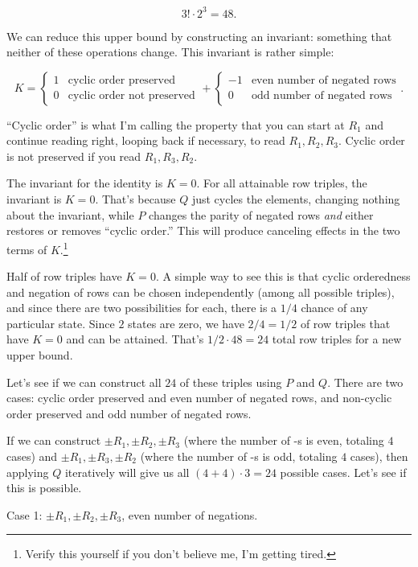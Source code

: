 \documentclass[../key.tex]{subfiles}
\begin{document}
$$3!\cdot 2^3 = 48.$$

We can reduce this upper bound by constructing an invariant: something that neither of these operations change. This invariant is rather simple:

$$K = \begin{cases}1 & \text{cyclic order preserved} \\ 0 & \text{cyclic order not preserved}\end{cases} + \begin{cases}-1 & \text{even number of negated rows} \\ 0 & \text{odd number of negated rows} \end{cases}.$$

``Cyclic order'' is what I'm calling the property that you can start at $R_1$ and continue reading right, looping back if necessary, to read $R_1,R_2,R_3$. Cyclic order is not preserved if you read $R_1,R_3,R_2$.

The invariant for the identity is $K=0$. For all attainable row triples, the invariant is $K=0$. That's because $Q$ just cycles the elements, changing nothing about the invariant, while $P$ changes the parity of negated rows \textit{and} either restores or removes ``cyclic order.'' This will produce canceling effects in the two terms of $K$.\footnote{Verify this yourself if you don't believe me, I'm getting tired.}

Half of row triples have $K=0$. A simple way to see this is that cyclic orderedness and negation of rows can be chosen independently (among all possible triples), and since there are two possibilities for each, there is a $1/4$ chance of any particular state. Since $2$ states are zero, we have $2/4=1/2$ of row triples that have $K=0$ and can be attained. That's $1/2\cdot 48 = 24$ total row triples for a new upper bound.

Let's see if we can construct all $24$ of these triples using $P$ and $Q$. There are two cases: cyclic order preserved and even number of negated rows, and non-cyclic order preserved and odd number of negated rows.

If we can construct $\pm R_1, \pm R_2, \pm R_3$ (where the number of -s is even, totaling $4$ cases) and $\pm R_1, \pm R_3, \pm R_2$ (where the number of -s is odd, totaling $4$ cases), then applying $Q$ iteratively will give us all $(4+4)\cdot 3 = 24$ possible cases. Let's see if this is possible.

Case 1: $\pm R_1, \pm R_2, \pm R_3$, even number of negations.
\end{document}
